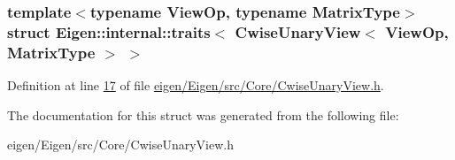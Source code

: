 \subsubsection*{template$<$typename View\+Op, typename Matrix\+Type$>$\newline
struct Eigen\+::internal\+::traits$<$ Cwise\+Unary\+View$<$ View\+Op, Matrix\+Type $>$ $>$}



Definition at line \hyperlink{eigen_2_eigen_2src_2_core_2_cwise_unary_view_8h_source_l00017}{17} of file \hyperlink{eigen_2_eigen_2src_2_core_2_cwise_unary_view_8h_source}{eigen/\+Eigen/src/\+Core/\+Cwise\+Unary\+View.\+h}.



The documentation for this struct was generated from the following file\+:\begin{DoxyCompactItemize}
\item 
eigen/\+Eigen/src/\+Core/\+Cwise\+Unary\+View.\+h\end{DoxyCompactItemize}
